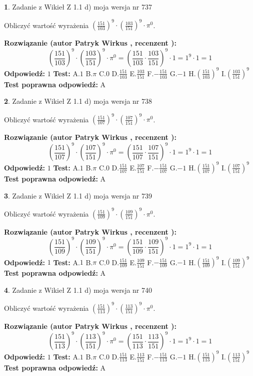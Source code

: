 \documentclass[12pt, a4paper]{article}
\theoremstyle{definition} %
\newtheorem{zad}{}
\newcommand{\zadStart}[1]{\begin{zad}#1\newline}
\newcommand{\zadStop}{\end{zad}}
\newcommand{\rozwStart}[2]{\noindent \textbf{Rozwiązanie (autor #1 , recenzent #2): }\newline}
\newcommand{\rozwStop}{\newline}
\newcommand{\odpStart}{\noindent \textbf{Odpowiedź:}\newline}
\newcommand{\odpStop}{\newline}
\newcommand{\testStart}{\noindent \textbf{Test:}\newline}
\newcommand{\testStop}{\newline}
\newcommand{\kluczStart}{\noindent \textbf{Test poprawna odpowiedź:}\newline}
\newcommand{\kluczStop}{\newline}
\begin{document}
\zadStart{Zadanie z Wikieł Z 1.1 d) moja wersja nr 737}

Obliczyć wartość wyrażenia $(\frac{151}{103})^{9} \cdot (\frac{103}{151})^{9} \cdot \pi^{0}$.
\zadStop
\rozwStart{Patryk Wirkus}{}
$$(\frac{151}{103})^{9} \cdot (\frac{103}{151})^{9} \cdot \pi^{0} = (\frac{151}{103} \cdot \frac{103}{151})^{9} \cdot 1 = 1^{9} \cdot 1 = 1$$
\rozwStop
\odpStart
$1$
\odpStop
\testStart
A.$1$ B.$\pi$ C.$0$ D.$\frac{151}{103}$ E.$\frac{103}{151}$
F.$-\frac{151}{103}$ G.$-1$
H.$(\frac{151}{103})^{9}$
I.$(\frac{103}{151})^{9}$
\testStop
\kluczStart
A
\kluczStop



\zadStart{Zadanie z Wikieł Z 1.1 d) moja wersja nr 738}

Obliczyć wartość wyrażenia $(\frac{151}{107})^{9} \cdot (\frac{107}{151})^{9} \cdot \pi^{0}$.
\zadStop
\rozwStart{Patryk Wirkus}{}
$$(\frac{151}{107})^{9} \cdot (\frac{107}{151})^{9} \cdot \pi^{0} = (\frac{151}{107} \cdot \frac{107}{151})^{9} \cdot 1 = 1^{9} \cdot 1 = 1$$
\rozwStop
\odpStart
$1$
\odpStop
\testStart
A.$1$ B.$\pi$ C.$0$ D.$\frac{151}{107}$ E.$\frac{107}{151}$
F.$-\frac{151}{107}$ G.$-1$
H.$(\frac{151}{107})^{9}$
I.$(\frac{107}{151})^{9}$
\testStop
\kluczStart
A
\kluczStop



\zadStart{Zadanie z Wikieł Z 1.1 d) moja wersja nr 739}

Obliczyć wartość wyrażenia $(\frac{151}{109})^{9} \cdot (\frac{109}{151})^{9} \cdot \pi^{0}$.
\zadStop
\rozwStart{Patryk Wirkus}{}
$$(\frac{151}{109})^{9} \cdot (\frac{109}{151})^{9} \cdot \pi^{0} = (\frac{151}{109} \cdot \frac{109}{151})^{9} \cdot 1 = 1^{9} \cdot 1 = 1$$
\rozwStop
\odpStart
$1$
\odpStop
\testStart
A.$1$ B.$\pi$ C.$0$ D.$\frac{151}{109}$ E.$\frac{109}{151}$
F.$-\frac{151}{109}$ G.$-1$
H.$(\frac{151}{109})^{9}$
I.$(\frac{109}{151})^{9}$
\testStop
\kluczStart
A
\kluczStop



\zadStart{Zadanie z Wikieł Z 1.1 d) moja wersja nr 740}

Obliczyć wartość wyrażenia $(\frac{151}{113})^{9} \cdot (\frac{113}{151})^{9} \cdot \pi^{0}$.
\zadStop
\rozwStart{Patryk Wirkus}{}
$$(\frac{151}{113})^{9} \cdot (\frac{113}{151})^{9} \cdot \pi^{0} = (\frac{151}{113} \cdot \frac{113}{151})^{9} \cdot 1 = 1^{9} \cdot 1 = 1$$
\rozwStop
\odpStart
$1$
\odpStop
\testStart
A.$1$ B.$\pi$ C.$0$ D.$\frac{151}{113}$ E.$\frac{113}{151}$
F.$-\frac{151}{113}$ G.$-1$
H.$(\frac{151}{113})^{9}$
I.$(\frac{113}{151})^{9}$
\testStop
\kluczStart
A
\kluczStop
\end{document}
